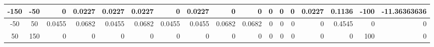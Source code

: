 \begin{table}[ht]
\begin{adjustbox}{width = \textwidth, center}
\begin{tabular}{|cc|r|r|r|r|r|r|r|r|r|r|r|r|r|r|r|}
        \cellcolor[HTML]{D0E0E3}-150           & \cellcolor[HTML]{EBF1FC}-50            & \cellcolor[HTML]{FFFFFF}0                      & \cellcolor[HTML]{C7E9D8}0.0227                 & \cellcolor[HTML]{C7E9D8}0.0227                 & \cellcolor[HTML]{C7E9D8}0.0227                 & \cellcolor[HTML]{FFFFFF}0                      & \cellcolor[HTML]{C7E9D8}0.0227                 & \cellcolor[HTML]{FFFFFF}0                      & \cellcolor[HTML]{FFFFFF}0                       & \cellcolor[HTML]{FFFFFF}0                       & \cellcolor[HTML]{FFFFFF}0                       & \cellcolor[HTML]{FFFFFF}0                       & \cellcolor[HTML]{C7E9D8}0.0227                  & \cellcolor[HTML]{D9D2E9}0.1136                                                  & \cellcolor[HTML]{D9D2E9}-100                                            & \cellcolor[HTML]{D9D2E9}-11.36363636                                                             \\ \hline
        \cellcolor[HTML]{D0E0E3}-50            & \cellcolor[HTML]{EBF1FC}50             & \cellcolor[HTML]{8FD2B1}0.0455                 & \cellcolor[HTML]{57BB8A}0.0682                 & \cellcolor[HTML]{8FD2B1}0.0455                 & \cellcolor[HTML]{57BB8A}0.0682                 & \cellcolor[HTML]{8FD2B1}0.0455                 & \cellcolor[HTML]{8FD2B1}0.0455                 & \cellcolor[HTML]{57BB8A}0.0682                 & \cellcolor[HTML]{57BB8A}0.0682                  & \cellcolor[HTML]{FFFFFF}0                       & \cellcolor[HTML]{FFFFFF}0                       & \cellcolor[HTML]{FFFFFF}0                       & \cellcolor[HTML]{FFFFFF}0                       & \cellcolor[HTML]{D9D2E9}0.4545                                                  & \cellcolor[HTML]{D9D2E9}0                                               & \cellcolor[HTML]{D9D2E9}0                                                                        \\ \hline
        \rowcolor[HTML]{FFFFFF} 
        \cellcolor[HTML]{D0E0E3}50             & \cellcolor[HTML]{EBF1FC}150            & 0                                              & 0                                              & 0                                              & 0                                              & 0                                              & 0                                              & 0                                              & 0                                               & 0                                               & 0                                               & 0                                               & 0                                               & \cellcolor[HTML]{D9D2E9}0                                                       & \cellcolor[HTML]{D9D2E9}100                                             & \cellcolor[HTML]{D9D2E9}0                                                                        \\ \hline

\end{tabular}
\end{adjustbox}
\end{table}
